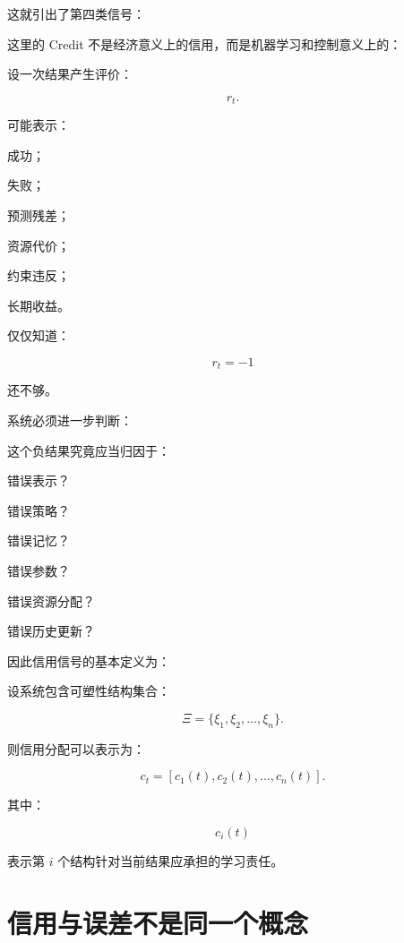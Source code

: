 这就引出了第四类信号：

\begin{statementbox}
\centering
{}
\end{statementbox}

这里的 Credit 不是经济意义上的信用，而是机器学习和控制意义上的：

\begin{statementbox}
\centering
{}
\end{statementbox}

设一次结果产生评价：

\[
r_t.
\]

可能表示：

成功；

失败；

预测残差；

资源代价；

约束违反；

长期收益。

仅仅知道：

\[
r_t=-1
\]

还不够。

系统必须进一步判断：

这个负结果究竟应当归因于：

错误表示？

错误策略？

错误记忆？

错误参数？

错误资源分配？

错误历史更新？

因此信用信号的基本定义为：

\begin{statementbox}
\centering
{}
\end{statementbox}

设系统包含可塑性结构集合：

\[
\Xi
=
\{
\xi_1,\xi_2,\ldots,\xi_n
\}.
\]

则信用分配可以表示为：

\[
\boxed{
c_t
=
[
c_1(t),
c_2(t),
\ldots,
c_n(t)
].
}
\]

其中：

\[
c_i(t)
\]

表示第 $i$ 个结构针对当前结果应承担的学习责任。

\section{信用与误差不是同一个概念}

